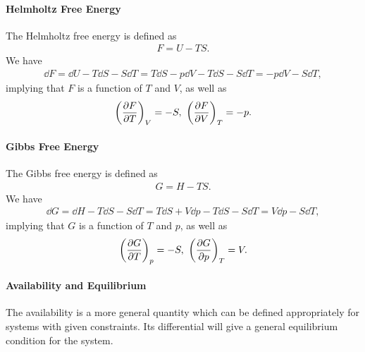 \paragraph{Helmholtz Free Energy}
The Helmholtz free energy is defined as
\begin{align*}
	F = U - TS.
\end{align*}
We have
\begin{align*}
	\dd{F} = \dd{U} - T\dd{S} - S\dd{T} = T\dd{S} - p\dd{V} - T\dd{S} - S\dd{T} = -p\dd{V} - S\dd{T},
\end{align*}
implying that $F$ is a function of $T$ and $V$, as well as
\begin{align*}
	\left(\pdv{F}{T}\right)_{V} = -S,\ \left(\pdv{F}{V}\right)_{T} = -p.
\end{align*}

\paragraph{Gibbs Free Energy}
The Gibbs free energy is defined as
\begin{align*}
	G = H - TS.
\end{align*}
We have
\begin{align*}
	\dd{G} = \dd{H} - T\dd{S} - S\dd{T} = T\dd{S} + V\dd{p} - T\dd{S} - S\dd{T} = V\dd{p} - S\dd{T},
\end{align*}
implying that $G$ is a function of $T$ and $p$, as well as
\begin{align*}
	\left(\pdv{G}{T}\right)_{p} = -S,\ \left(\pdv{G}{p}\right)_{T} = V.
\end{align*}

\paragraph{Availability and Equilibrium}
The availability is a more general quantity which can be defined appropriately for systems with given constraints. Its differential will give a general equilibrium condition for the system.

